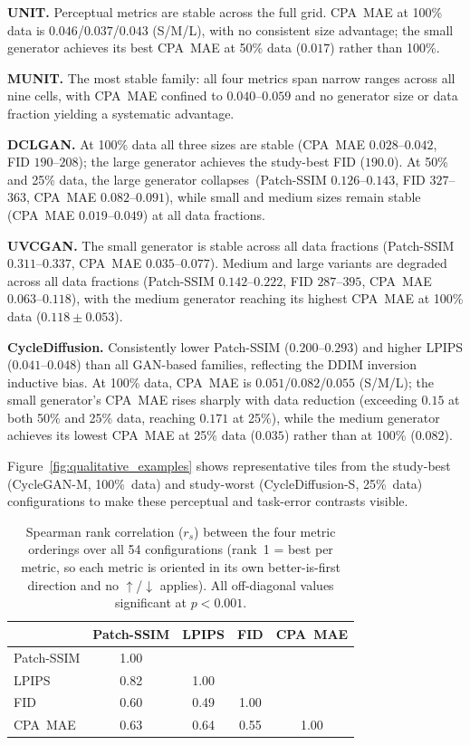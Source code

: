 \noindent\textbf{UNIT.}
Perceptual metrics are stable across the full grid.
CPA~MAE at 100\% data is $0.046$/$0.037$/$0.043$ (S/M/L), with no consistent size
advantage; the small generator achieves its best CPA~MAE at 50\% data ($0.017$) rather
than 100\%.

\noindent\textbf{MUNIT.}
The most stable family: all four metrics span narrow ranges across all nine cells, with
CPA~MAE confined to $0.040$--$0.059$ and no generator size or data fraction yielding a
systematic advantage.

\noindent\textbf{DCLGAN.}
At 100\% data all three sizes are stable (CPA~MAE $0.028$--$0.042$, FID $190$--$208$);
the large generator achieves the study-best FID ($190.0$).
At 50\% and 25\% data, the large generator collapses~(Patch-SSIM $0.126$--$0.143$, FID
$327$--$363$, CPA~MAE $0.082$--$0.091$), while small and medium sizes remain stable
(CPA~MAE $0.019$--$0.049$) at all data fractions.

\noindent\textbf{UVCGAN.}
The small generator is stable across all data fractions (Patch-SSIM $0.311$--$0.337$,
CPA~MAE $0.035$--$0.077$).
Medium and large variants are degraded across all data fractions (Patch-SSIM
$0.142$--$0.222$, FID $287$--$395$, CPA~MAE $0.063$--$0.118$), with the medium
generator reaching its highest CPA~MAE at 100\% data ($0.118 \pm 0.053$).

\noindent\textbf{CycleDiffusion.}
Consistently lower Patch-SSIM ($0.200$--$0.293$) and higher LPIPS ($0.041$--$0.048$)
than all GAN-based families, reflecting the DDIM inversion inductive bias.
At 100\% data, CPA~MAE is $0.051$/$0.082$/$0.055$ (S/M/L); the small generator's
CPA~MAE rises sharply with data reduction (exceeding $0.15$ at both 50\% and 25\% data,
reaching $0.171$ at 25\%), while the medium generator achieves its lowest CPA~MAE at
25\% data ($0.035$) rather than at 100\% ($0.082$).

Figure~\ref{fig:qualitative_examples} shows representative tiles from the study-best
(CycleGAN-M, 100\%~data) and study-worst (CycleDiffusion-S, 25\%~data) configurations
to make these perceptual and task-error contrasts visible.



\begin{table}[h!]
  \centering
  \caption{Spearman rank correlation ($r_s$) between the four metric orderings over
    all 54 configurations (rank~1 = best per metric, so each metric is oriented in its
    own better-is-first direction and no $\uparrow$/$\downarrow$ applies). All
    off-diagonal values significant at $p{<}0.001$.}
  \label{tab:ranking_correlation}
  \begin{tabular}{lcccc}
    \toprule
     & Patch-SSIM & LPIPS & FID & CPA~MAE \\
    \midrule
    Patch-SSIM & 1.00 & & & \\
    LPIPS      & 0.82 & 1.00 & & \\
    FID        & 0.60 & 0.49 & 1.00 & \\
    CPA~MAE    & 0.63 & 0.64 & 0.55 & 1.00 \\
    \bottomrule
  \end{tabular}
\end{table}

